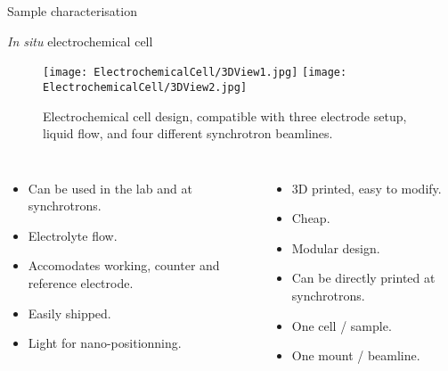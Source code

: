 \begin{column}{\colwidth}
\begin{block}{Sample characterisation}

    \end{block}

    \begin{block}{\textit{In situ} electrochemical cell}

        \begin{figure}
            \centering
            \texttt{[image: ElectrochemicalCell/3DView1.jpg]}
            \texttt{[image: ElectrochemicalCell/3DView2.jpg]}
            \caption{Electrochemical cell design, compatible with three electrode setup, liquid flow, and four different synchrotron beamlines.}
        \end{figure}

        \begin{columns}

            \begin{itemize}
                \setlength\itemsep{1em}
                \item Can be used in the lab and at synchrotrons.
                \item Electrolyte flow.
                \item Accomodates working, counter and reference electrode.
                \item Easily shipped.
                \item Light for nano-positionning.
            \end{itemize}

            \begin{itemize}
                \setlength\itemsep{1em}
                \item 3D printed, easy to modify.
                \item Cheap.
                \item Modular design.
                \item Can be directly printed at synchrotrons.
                \item One cell / sample.
                \item One mount / beamline.
            \end{itemize}

        \end{columns}
    \end{block}

\end{column}
